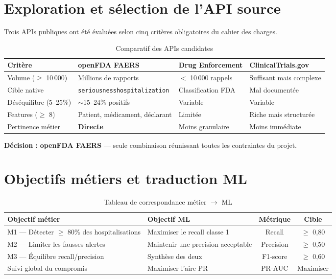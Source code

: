 \documentclass[11pt,a4paper,twoside,openright]{report}
\begin{document}
\section{Exploration et sélection de l'API source}

Trois APIs publiques ont été évaluées selon cinq critères obligatoires du cahier des charges.

\begin{table}[H]
  \centering
  \caption{Comparatif des APIs candidates}
  \label{tab:apis}
  \small
  \begin{tabularx}{\textwidth}{lXXX}
    \toprule
    \textbf{Critère} & \textbf{openFDA FAERS} & \textbf{Drug Enforcement} & \textbf{ClinicalTrials.gov} \\
    \midrule
    Volume ($\geq$ 10\,000) & Millions de rapports & $<$ 10\,000 rappels & Suffisant mais complexe \\
    Cible native            & \texttt{seriousnesshospitalization} & Classification FDA & Mal documentée \\
    Déséquilibre (5–25\%)   & $\sim$15–24\% positifs & Variable & Variable \\
    Features ($\geq$ 8)     & Patient, médicament, déclarant & Limitée & Riche mais structurée \\
    Pertinence métier       & \textbf{Directe} & Moins granulaire & Moins immédiate \\
    \bottomrule
  \end{tabularx}
\end{table}

\textbf{Décision :} \textbf{openFDA FAERS} — seule combinaison réunissant toutes les contraintes du projet.

\section{Objectifs métiers et traduction ML}

\begin{table}[H]
  \centering
  \caption{Tableau de correspondance métier $\rightarrow$ ML}
  \label{tab:objectifs}
  \begin{tabular}{p{5.5cm}p{4.5cm}cc}
    \toprule
    \textbf{Objectif métier} & \textbf{Objectif ML} & \textbf{Métrique} & \textbf{Cible} \\
    \midrule
    M1 — Détecter $\geq$ 80\% des hospitalisations & Maximiser le recall classe 1 & Recall & $\geq$ 0,80 \\
    M2 — Limiter les fausses alertes & Maintenir une precision acceptable & Precision & $\geq$ 0,50 \\
    M3 — Équilibre recall/precision & Synthèse des deux & F1-score & $\geq$ 0,60 \\
    Suivi global du compromis & Maximiser l'aire PR & PR-AUC & Maximiser \\
    \bottomrule
  \end{tabular}
\end{table}
\end{document}
